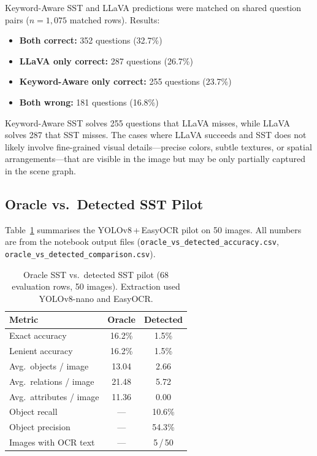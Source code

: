 \documentclass[10pt,twocolumn]{article}
\begin{document}
Keyword-Aware SST and LLaVA predictions were matched on shared question pairs ($n = 1{,}075$ matched rows). Results:

\begin{itemize}
  \item \textbf{Both correct:} 352 questions (32.7\%)
  \item \textbf{LLaVA only correct:} 287 questions (26.7\%)
  \item \textbf{Keyword-Aware only correct:} 255 questions (23.7\%)
  \item \textbf{Both wrong:} 181 questions (16.8\%)
\end{itemize}

Keyword-Aware SST solves 255 questions that LLaVA misses, while LLaVA solves 287 that SST misses. The cases where LLaVA succeeds and SST does not likely involve fine-grained visual details---precise colors, subtle textures, or spatial arrangements---that are visible in the image but may be only partially captured in the scene graph.

\subsection{Oracle vs.\ Detected SST Pilot}

Table~\ref{tab:oracle} summarises the YOLOv8\,+\,EasyOCR pilot on 50 images. All numbers are from the notebook output files (\texttt{oracle\_vs\_detected\_accuracy.csv}, \texttt{oracle\_vs\_detected\_comparison.csv}).

\begin{table}[H]
\centering
\caption{Oracle SST vs.\ detected SST pilot (68 evaluation rows, 50 images). Extraction used YOLOv8-nano and EasyOCR.}
\label{tab:oracle}
\begin{tabular}{lcc}
\toprule
\textbf{Metric} & \textbf{Oracle} & \textbf{Detected} \\
\midrule
Exact accuracy & 16.2\% & 1.5\% \\
Lenient accuracy & 16.2\% & 1.5\% \\
Avg.\ objects / image & 13.04 & 2.66 \\
Avg.\ relations / image & 21.48 & 5.72 \\
Avg.\ attributes / image & 11.36 & 0.00 \\
Object recall & --- & 10.6\% \\
Object precision & --- & 54.3\% \\
Images with OCR text & --- & 5\,/\,50 \\
\bottomrule
\end{tabular}
\end{table}
\end{document}
